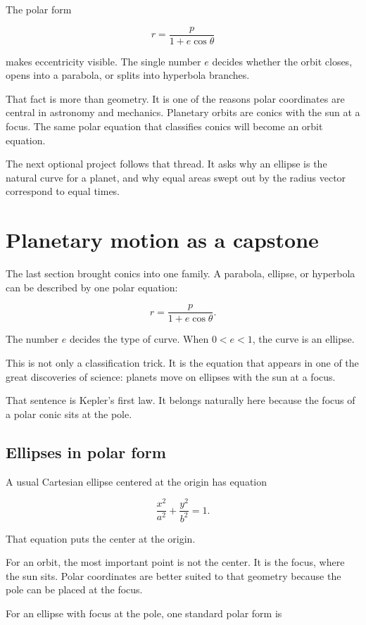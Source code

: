The polar form

\[
r=\frac{p}{1+e\cos\theta}
\]

makes eccentricity visible.  The single number \(e\) decides whether the orbit closes,
opens into a parabola, or splits into hyperbola branches.

That fact is more than geometry.  It is one of the reasons polar coordinates are central
in astronomy and mechanics.  Planetary orbits are conics with the sun at a focus.  The
same polar equation that classifies conics will become an orbit equation.

The next optional project follows that thread.  It asks why an ellipse is the natural curve
for a planet, and why equal areas swept out by the radius vector correspond to equal
times.
\section{Planetary motion as a capstone}
\label{sec:planetary-motion-capstone}

The last section brought conics into one family.  A parabola, ellipse, or hyperbola can
be described by one polar equation:

\[
r=\frac{p}{1+e\cos\theta}.
\]

The number \(e\) decides the type of curve.  When \(0<e<1\), the curve is an ellipse.

This is not only a classification trick.  It is the equation that appears in one of the
great discoveries of science: planets move on ellipses with the sun at a focus.

That sentence is Kepler's first law.  It belongs naturally here because the focus of a
polar conic sits at the pole.

\subsection{Ellipses in polar form}
\label{subsec:ellipses-polar-form}

A usual Cartesian ellipse centered at the origin has equation

\[
\frac{x^2}{a^2}+\frac{y^2}{b^2}=1.
\]

That equation puts the center at the origin.

For an orbit, the most important point is not the center.  It is the focus, where the sun
sits.  Polar coordinates are better suited to that geometry because the pole can be placed
at the focus.

For an ellipse with focus at the pole, one standard polar form is


